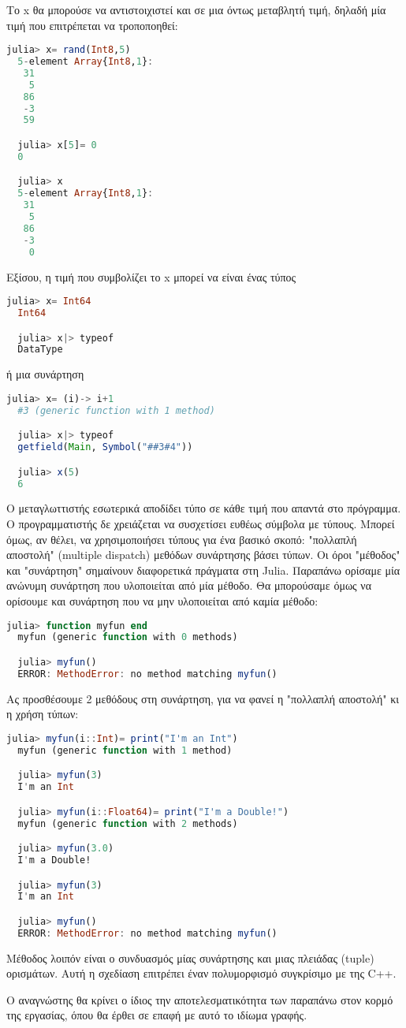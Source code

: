   Το x θα μπορούσε να αντιστοιχιστεί και σε μια όντως μεταβλητή τιμή, δηλαδή μία τιμή που επιτρέπεται να τροποποηθεί:
  \begin{lstlisting}[language=julia]
  julia> x= rand(Int8,5)
  5-element Array{Int8,1}:
   31
    5
   86
   -3
   59

  julia> x[5]= 0
  0

  julia> x
  5-element Array{Int8,1}:
   31
    5
   86
   -3
    0
  \end{lstlisting}

  Εξίσου, η τιμή που συμβολίζει το x μπορεί να είναι ένας τύπος
  \begin{lstlisting}[language=julia]
  julia> x= Int64
  Int64

  julia> x|> typeof
  DataType
  \end{lstlisting}
  ή μια συνάρτηση
  \begin{lstlisting}[language=julia]
  julia> x= (i)-> i+1
  #3 (generic function with 1 method)

  julia> x|> typeof
  getfield(Main, Symbol("##3#4"))

  julia> x(5)
  6
  \end{lstlisting}

  Ο μεταγλωττιστής εσωτερικά αποδίδει τύπο σε κάθε τιμή που απαντά στο πρόγραμμα.
  Ο προγραμματιστής δε χρειάζεται να συσχετίσει ευθέως σύμβολα με τύπους.
  Μπορεί όμως, αν θέλει, να χρησιμοποιήσει τύπους για ένα βασικό σκοπό:
  "πολλαπλή αποστολή" (multiple dispatch) μεθόδων συνάρτησης βάσει τύπων.
  Οι όροι "μέθοδος" και "συνάρτηση" σημαίνουν διαφορετικά πράγματα στη Julia. Παραπάνω ορίσαμε μία ανώνυμη συνάρτηση που υλοποιείται από μία μέθοδο.
  Θα μπορούσαμε όμως να ορίσουμε και συνάρτηση που να μην υλοποιείται από καμία μέθοδο:
  \begin{lstlisting}[language=julia]
  julia> function myfun end
  myfun (generic function with 0 methods)

  julia> myfun()
  ERROR: MethodError: no method matching myfun()
  \end{lstlisting}

  Ας προσθέσουμε 2 μεθόδους στη συνάρτηση, για να φανεί η "πολλαπλή αποστολή" κι η χρήση τύπων:
  \begin{lstlisting}[language=julia]
  julia> myfun(i::Int)= print("I'm an Int")
  myfun (generic function with 1 method)

  julia> myfun(3)
  I'm an Int

  julia> myfun(i::Float64)= print("I'm a Double!")
  myfun (generic function with 2 methods)

  julia> myfun(3.0)
  I'm a Double!

  julia> myfun(3)
  I'm an Int

  julia> myfun()
  ERROR: MethodError: no method matching myfun()
  \end{lstlisting}

  Μέθοδος λοιπόν είναι ο συνδυασμός μίας συνάρτησης και μιας πλειάδας (tuple) ορισμάτων.
  Αυτή η σχεδίαση επιτρέπει έναν πολυμορφισμό συγκρίσιμο με της C++.

  Ο αναγνώστης θα κρίνει ο ίδιος την αποτελεσματικότητα των παραπάνω στον κορμό της εργασίας, όπου θα έρθει σε επαφή με αυτό το ιδίωμα γραφής.
